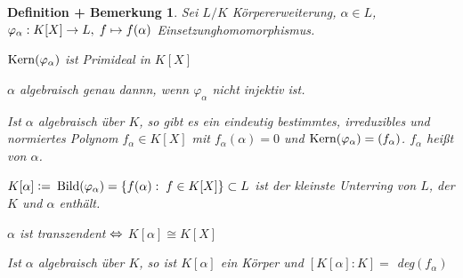 \documentclass[a4paper,10pt,german]{scrbook}
\theoremstyle{saetze}
\theoremstyle{definitionen}
\newtheorem{DefBem}[Def]{Definition + Bemerkung}
\begin{document}
\begin{DefBem}
\label{minimalpolynome}
Sei $L/K$ Körpererweiterung,
$\alpha \in L$, $\\\varphi_\alpha: K[X] \rightarrow L,\;f\mapsto f(\alpha)$
Einsetzunghomomorphismus.
\begin{enum}
\item $\mathop{\rm Kern}\nolimits(\varphi_\alpha)$ ist Primideal in $K[X]$


\item $\alpha$ algebraisch genau dannn, wenn $\varphi_\alpha$ nicht injektiv ist.

\item Ist $\alpha$ algebraisch über $K$, so gibt es ein eindeutig
bestimmtes, irreduzibles und normiertes Polynom $f_\alpha \in K[X]$
mit $f_\alpha(\alpha) = 0$ und $\mathop{\rm Kern}\nolimits(\varphi_\alpha) = (f_\alpha)$.
\newline $f_\alpha$ heißt  von $\alpha$.


\item $K[\alpha] \mathrel{\mathop:}=$ $\mathop{\rm Bild}\nolimits(\varphi_\alpha) = \{f(\alpha):\;f
\in K[X]\} \subset L$ ist der kleinste Unterring von $L$, der $K$
und $\alpha$ enthält.

\item $\alpha$ ist transzendent $\Leftrightarrow$ $K[\alpha] \cong K[X]$


\item Ist $\alpha$ algebraisch über $K$, so ist $K[\alpha]$ ein
Körper und $[K[\alpha]:K] =$ deg$(f_\alpha)$


\end{enum}
\end{DefBem}
\end{document}
